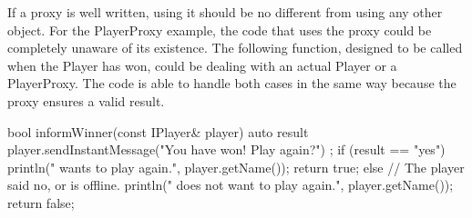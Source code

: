 
If a proxy is well written, using it should be no different from using any other object. For the PlayerProxy example, the code that uses the proxy could be completely unaware of its existence. The following function, designed to be called when the Player has won, could be dealing with an actual Player or a PlayerProxy. The code is able to handle both cases in the same way because the proxy ensures a valid result.

\begin{cpp}
bool informWinner(const IPlayer& player)
{
    auto result { player.sendInstantMessage("You have won! Play again?") };
    if (result == "yes") {
        println("{} wants to play again.", player.getName());
        return true;
    } else {
        // The player said no, or is offline.
        println("{} does not want to play again.", player.getName());
        return false;
    }
}
\end{cpp}






